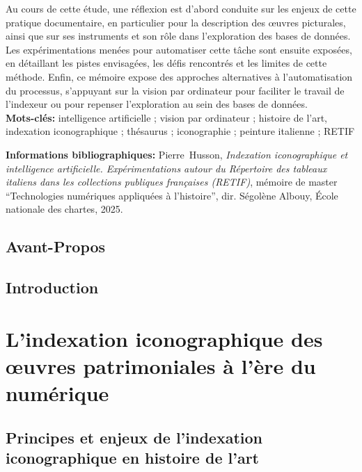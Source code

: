 \documentclass[12pt,twoside]{book}
\newcommand{\PrenomAuteur}{Pierre}
\newcommand{\NomAuteur}{Husson}
\newcommand{\Auteur}{\PrenomAuteur\ \NomAuteur}
\newcommand{\TitreMemoire}{Indexation iconographique et intelligence artificielle}
\newcommand{\SousTitreMemoire}{Expérimentations autour du Répertoire des tableaux italiens dans les collections publiques françaises (RETIF)}
\begin{document}
    Au cours de cette étude, une réflexion est d'abord conduite sur les enjeux de cette pratique documentaire, en particulier pour la description des œuvres picturales, ainsi que sur ses instruments et son rôle dans l’exploration des bases de données. Les expérimentations menées pour automatiser cette tâche sont ensuite exposées, en détaillant les pistes envisagées, les défis rencontrés et les limites de cette méthode. Enfin, ce mémoire expose des approches alternatives à l'automatisation du processus, s'appuyant sur la vision par ordinateur pour faciliter le travail de l’indexeur ou pour repenser l'exploration au sein des bases de données.\\
	
	\textbf{Mots-clés:} intelligence artificielle ; vision par ordinateur ; histoire de l'art, indexation iconographique ; thésaurus ; iconographie ; peinture italienne ; RETIF
	
	\textbf{Informations bibliographiques:} {\Auteur}, \textit{\TitreMemoire. \SousTitreMemoire}, mémoire de master \enquote{Technologies numériques appliquées à l'histoire}, dir. Ségolène Albouy, École nationale des chartes, 2025.
	
		\newpage{\pagestyle{empty}\cleardoublepage}
	
	\chapter{Avant-Propos}

    
	\newpage{\pagestyle{empty}\cleardoublepage}
	
\printbibliography

	
\chapter{Introduction}	


\newpage{\pagestyle{empty}\cleardoublepage}

	\mainmatter
	

	\part{L’indexation iconographique des œuvres patrimoniales à l’ère du numérique}

\chapter[Indexation : principes et enjeux]{Principes et enjeux de l’indexation iconographique en histoire de l’art}

\end{document}
